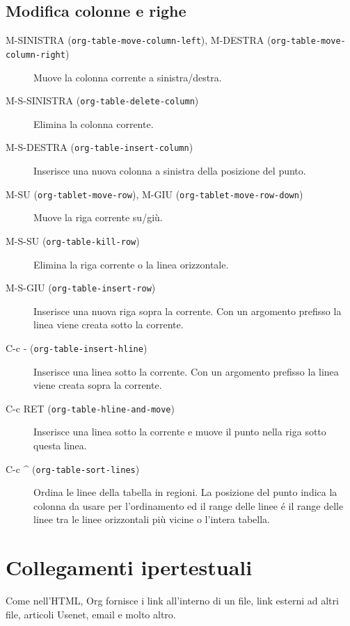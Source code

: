 \documentclass[11pt]{article}
\begin{document}
\subsection*{Modifica colonne e righe}
\label{sec:org862f73e}
\begin{description}
\item[{M-SINISTRA (\texttt{org-table-move-column-left}), M-DESTRA (\texttt{org-table-move-column-right})}] Muove la colonna corrente a sinistra/destra.

\item[{M-S-SINISTRA (\texttt{org-table-delete-column})}] Elimina la colonna corrente.

\item[{M-S-DESTRA (\texttt{org-table-insert-column})}] Inserisce una nuova colonna a sinistra della posizione del punto.

\item[{M-SU (\texttt{org-tablet-move-row}), M-GIU (\texttt{org-tablet-move-row-down})}] Muove la riga corrente su/giù.

\item[{M-S-SU (\texttt{org-table-kill-row})}] Elimina la riga corrente o la linea orizzontale.

\item[{M-S-GIU (\texttt{org-table-insert-row})}] Inserisce una nuova riga sopra la corrente. Con un argomento
prefisso la linea viene creata sotto la corrente.

\item[{C-c - (\texttt{org-table-insert-hline})}] Inserisce una linea sotto la corrente. Con un argomento prefisso la
linea viene creata sopra la corrente.

\item[{C-c RET (\texttt{org-table-hline-and-move})}] Inserisce una linea sotto la corrente e muove il punto nella riga
sotto questa linea.

\item[{C-c \^{} (\texttt{org-table-sort-lines})}] Ordina le linee della tabella in regioni. La posizione del punto
indica la colonna da usare per l'ordinamento ed il range delle linee
é il range delle linee tra le linee orizzontali più vicine o
l'intera tabella.
\end{description}

\section{Collegamenti ipertestuali}
\label{sec:orgd2358b9}
Come nell'HTML, Org fornisce i link all'interno di un file, link
esterni ad altri file, articoli Usenet, email e molto altro.
\end{document}
